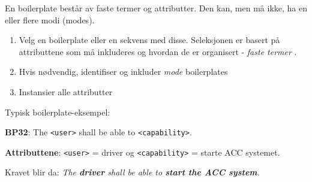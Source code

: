 En boilerplate består av faste termer og attributter. Den kan, men må
ikke, ha en eller flere modi (modes).

\begin{enumerate}[1.]
\item
  Velg en boilerplate eller en sekvens med disse. Seleksjonen er basert
  på attributtene som må inkluderes og hvordan de er organisert -
  \emph{faste termer} .
\item
  Hvis nødvendig, identifiser og inkluder \emph{mode} boilerplates
\item
  Instansier alle attributter
\end{enumerate}
Typisk boilerplate-eksempel:

\textbf{BP32}: The \texttt{\textless{}user\textgreater{}} shall be able
to \texttt{\textless{}capability\textgreater{}}.

\textbf{Attributtene}: \texttt{\textless{}user\textgreater{}} = driver
og \texttt{\textless{}capability\textgreater{}} = starte ACC systemet.

Kravet blir da: \emph{The \textbf{driver} shall be able to \textbf{start
the ACC system}.}

